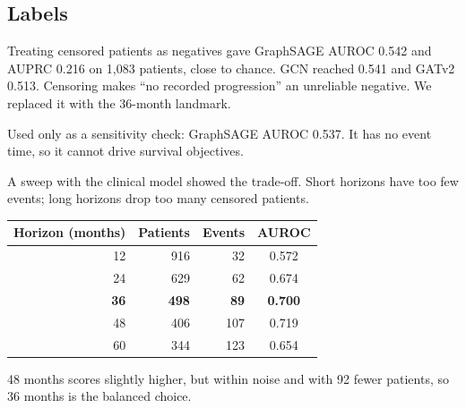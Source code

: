 \documentclass[11pt,a4paper]{article}
\begin{document}
\subsection{Labels}
\begin{dropbox}
Treating censored patients as negatives gave GraphSAGE AUROC 0.542 and AUPRC 0.216 on 1,083 patients, close to chance. GCN reached 0.541 and GATv2 0.513. Censoring makes ``no recorded progression'' an unreliable negative. We replaced it with the 36-month landmark.
\end{dropbox}
\begin{dropbox}
Used only as a sensitivity check: GraphSAGE AUROC 0.537. It has no event time, so it cannot drive survival objectives.
\end{dropbox}
\begin{whybox}
A sweep with the clinical model showed the trade-off. Short horizons have too few events; long horizons drop too many censored patients.
\begin{center}
\begin{tabular}{rrrc}
\toprule
Horizon (months) & Patients & Events & AUROC \\
\midrule
12 & 916 & 32 & 0.572 \\
24 & 629 & 62 & 0.674 \\
\textbf{36} & \textbf{498} & \textbf{89} & \textbf{0.700} \\
48 & 406 & 107 & 0.719 \\
60 & 344 & 123 & 0.654 \\
\bottomrule
\end{tabular}
\end{center}
48 months scores slightly higher, but within noise and with 92 fewer patients, so 36 months is the balanced choice.
\end{whybox}
\end{document}
